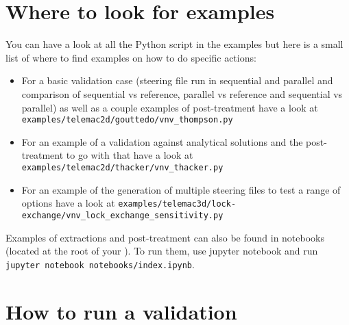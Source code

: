 \section{Where to look for examples}
You can have a look at all the Python script in the examples but here is a
small list of where to find examples on how to do specific actions:
\begin{itemize}
\item For a basic validation case (steering file run in sequential and parallel
  and comparison of sequential vs reference, parallel vs reference and
  sequential vs parallel) as well as a couple examples of post-treatment have a
  look at \verb!examples/telemac2d/gouttedo/vnv_thompson.py!
\item For an example of a validation against analytical solutions and the
  post-treatment to go with that have a look at
    \verb!examples/telemac2d/thacker/vnv_thacker.py!
\item For an example of the generation of multiple steering files to test a
  range of options have a look at
    \verb!examples/telemac3d/lock-exchange/vnv_lock_exchange_sensitivity.py!
\end{itemize}

Examples of extractions and post-treatment can also be found in notebooks
(located at the root of your \telemacsystem). To run them, use jupyter notebook
and run \verb!jupyter notebook notebooks/index.ipynb!.

\section{How to run a validation}

